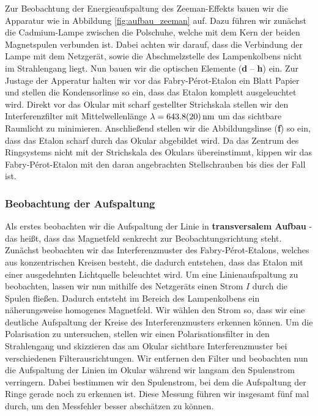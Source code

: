 \documentclass[11pt, a4paper]{article}
\begin{document}
Zur Beobachtung der Energieaufspaltung des Zeeman-Effekts bauen wir die Apparatur wie in Abbildung \ref{fig:aufbau_zeeman} auf.
Dazu führen wir zunächst die Cadmium-Lampe zwischen die Polschuhe, welche mit dem Kern der beiden Magnetspulen verbunden ist.
Dabei achten wir darauf, dass die Verbindung der Lampe mit dem Netzgerät, sowie die Abschmelzstelle des Lampenkolbens nicht im Strahlengang liegt.
Nun bauen wir die optischen Elemente (\textbf{d} -- \textbf{h}) ein.
Zur Justage der Apperatur halten wir vor das Fabry-Pérot-Etalon ein Blatt Papier und stellen die Kondensorlinse so ein, dass das Etalon komplett ausgeleuchtet wird.
Direkt vor das Okular mit scharf gestellter Strichskala stellen wir den Interferenzfilter mit Mittelwellenlänge $\lambda = \SI{643,8 +- 2}{\nano\metre}$ um das sichtbare Raumlicht zu minimieren.
Anschließend stellen wir die Abbildungslinse (\textbf{f}) so ein, dass das Etalon scharf durch das Okular abgebildet wird.
Da das Zentrum des Ringsystems nicht mit der Strichskala des Okulars übereinstimmt, kippen wir das Fabry-Pérot-Etalon mit den daran angebrachten Stellschrauben bis dies der Fall ist.

\subsubsection{Beobachtung der Aufspaltung}
Als erstes beobachten wir die Aufspaltung der Linie in \textbf{transversalem Aufbau} - das heißt, dass das Magnetfeld senkrecht zur Beobachtungsrichtung steht.
Zunächst beobachten wir das Interferenzmuster des Fabry-Pérot-Etalons, welches aus konzentrischen Kreisen besteht, die dadurch entstehen, dass das Etalon mit einer ausgedehnten Lichtquelle beleuchtet wird.
Um eine Linienaufspaltung zu beobachten, lassen wir nun mithilfe des Netzgeräts einen Strom $I$ durch die Spulen fließen.
Dadurch entsteht im Bereich des Lampenkolbens ein näherungsweise homogenes Magnetfeld.
Wir wählen den Strom so, dass wir eine deutliche Aufspaltung der Kreise des Interferenzmusters erkennen können.
Um die Polarisation zu untersuchen, stellen wir einen Polarisationsfilter in den Strahlengang und skizzieren das am Okular sichtbare Interferenzmuster bei verschiedenen Filterausrichtungen.
Wir entfernen den Filter und beobachten nun die Aufspaltung der Linien im Okular während wir langsam den Spulenstrom verringern.
Dabei bestimmen wir den Spulenstrom, bei dem die Aufspaltung der Ringe gerade noch zu erkennen ist.
Diese Messung führen wir insgesamt fünf mal durch, um den Messfehler besser abschätzen zu können.
\end{document}
